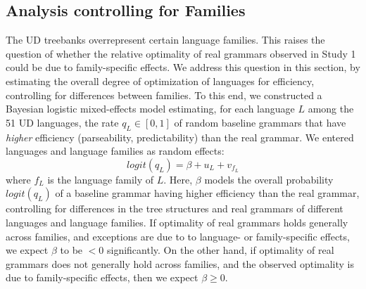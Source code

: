 \documentclass[10pt,twoside,lineno]{article}
\begin{document}
%
%
%
%
%


\subsection{Analysis controlling for Families}

The UD treebanks overrepresent certain language families.
This raises the question of whether the relative optimality of real grammars observed in Study 1 could be due to family-specific effects.
We address this question in this section, by estimating the overall degree of optimization of languages for efficiency, controlling for differences between families.
To this end, we constructed a Bayesian logistic mixed-effects model estimating, for each language $L$ among the 51 UD languages, the rate $q_L \in [0,1]$ of random baseline grammars that have \emph{higher} efficiency (parseability, predictability) than the real grammar.
We entered languages and language families as random effects:
\begin{equation}\label{eq:mixed-effects-study1}
logit(q_{L}) = \beta + u_{L} + v_{f_L}
\end{equation}
where $f_L$ is the language family of $L$.
Here, $\beta$ models the overall probability $logit(q_{L})$ of a baseline grammar having higher efficiency than the real grammar, controlling for differences in the tree structures and real grammars of different languages and language families.
If optimality of real grammars holds generally across families, and exceptions are due to to language- or family-specific effects, we expect $\beta$ to be $<0$ significantly.
On the other hand, if optimality of real grammars does not generally hold across families, and the observed optimality is due to family-specific effects, then we expect $\beta \geq 0$.
\end{document}
